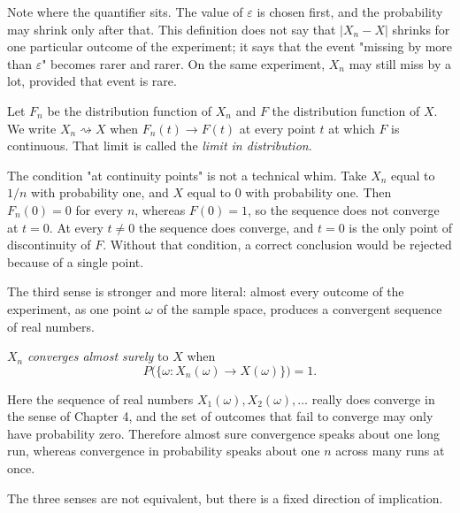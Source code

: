 Note where the quantifier sits. The value of $\varepsilon$ is chosen first, and the
probability may shrink only after that. This definition does not say that
$|X_n-X|$ shrinks for one particular outcome of the experiment; it says that the
event "missing by more than $\varepsilon$" becomes rarer and rarer. On the same
experiment, $X_n$ may still miss by a lot, provided that event is rare.


\begin{definisi}
Let $F_n$ be the distribution function of $X_n$ and $F$ the distribution function
of $X$. We write $X_n\rightsquigarrow X$ when $F_n(t)\to F(t)$ at every point $t$
at which $F$ is continuous. That limit is called the \emph{limit in
distribution}.
\end{definisi}

The condition "at continuity points" is not a technical whim. Take $X_n$ equal to
$1/n$ with probability one, and $X$ equal to $0$ with probability one. Then
$F_n(0)=0$ for every $n$, whereas $F(0)=1$, so the sequence does not converge at
$t=0$. At every $t\neq0$ the sequence does converge, and $t=0$ is the only point of
discontinuity of $F$. Without that condition, a correct conclusion would be
rejected because of a single point.

The third sense is stronger and more literal: almost every outcome of the
experiment, as one point $\omega$ of the sample space, produces a convergent
sequence of real numbers.

\begin{definisi}
$X_n$ \emph{converges almost surely} to $X$ when
\[
P\bigl(\{\omega : X_n(\omega)\to X(\omega)\}\bigr)=1 .
\]
\end{definisi}

Here the sequence of real numbers $X_1(\omega),X_2(\omega),\dots$ really does
converge in the sense of Chapter 4, and the set of outcomes that fail to converge
may only have probability zero. Therefore almost sure convergence speaks about one
long run, whereas convergence in probability speaks about one $n$ across many runs
at once.

The three senses are not equivalent, but there is a fixed direction of implication.

